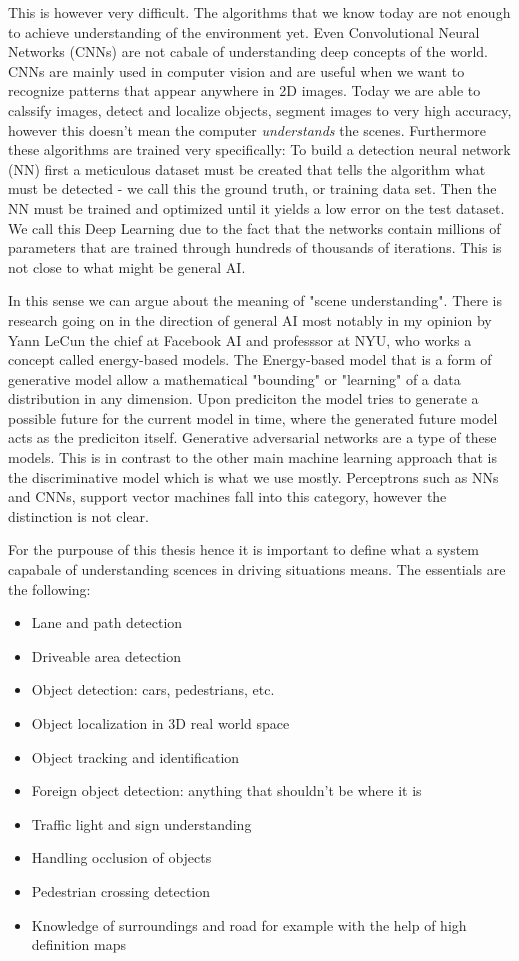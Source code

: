 This is however very difficult. The algorithms that we know today are not enough
to achieve understanding of the environment yet. Even Convolutional Neural
Networks (CNNs) are not cabale of understanding deep concepts of the world. CNNs
are mainly used in computer vision and are useful when we want to recognize
patterns that appear anywhere in 2D images. Today we are able to calssify
images, detect and localize objects, segment images to very high accuracy,
however this doesn't mean the computer \emph{understands} the scenes.
Furthermore these algorithms are trained very specifically: To build a detection
neural network (NN) first a meticulous dataset must be created that tells the
algorithm what must be detected - we call this the ground truth, or training
data set. Then the NN must be trained and optimized until it yields a low error
on the test dataset. We call this Deep Learning due to the fact that the
networks contain millions of parameters that are trained through hundreds of
thousands of iterations. This is not close to what might be general AI.

In this sense we can argue about the meaning of "scene understanding". There is
research going on in the direction of general AI most notably in my opinion by
Yann LeCun the chief at Facebook AI and professsor at NYU, who works a concept
called energy-based models. The Energy-based model that is a form of generative
model allow a mathematical "bounding" or "learning" of a data distribution in
any dimension. Upon prediciton the model tries to generate a possible future for
the current model in time, where the generated future model acts as the
prediciton itself. Generative adversarial networks are a type of these models.
This is in contrast to the other main machine learning approach that is the
discriminative model which is what we use mostly. Perceptrons such as NNs and
CNNs, support vector machines fall into this category, however the distinction
is not clear.

For the purpouse of this thesis hence it is important to define what a system
capabale of understanding scences in driving situations means. The essentials
are the following:
\begin{itemize}
    \item Lane  and path detection
    \item Driveable area detection
    \item Object detection: cars, pedestrians, etc.
    \item Object localization in 3D real world space
    \item Object tracking and identification
    \item Foreign object detection: anything that shouldn't be where it is
    \item Traffic light and sign understanding
    \item Handling occlusion of objects
    \item Pedestrian crossing detection
    \item Knowledge of surroundings and road for example with the help of high
          definition maps
\end{itemize}

